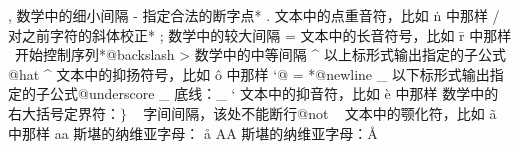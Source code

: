 \capcs , {数学中的细小间隔}{}{\@comma}
\capcs - {指定合法的断字点}*{\@minus}
\capcs . {文本中的点重音符，比如 \.n 中那样}{}{\@dot}
\capcs / {对之前字符的斜体校正}*{\@slash}
\capcs ; {数学中的较大间隔}{}{\@semi}
\capcs = {文本中的长音符号，比如 \=r 中那样}{}{\@equal}
\capac \ {开始控制序列}*{@backslash}
\capcs > {数学中的中等间隔}{}{\@greater}
\capac ^ {以上标形式输出指定的子公式}{}{@hat}
\capcs ^ {文本中的抑扬符号，比如 \^o 中那样}{}{\@hat}
{\catcode `@ = 
*{@newline}
}%
\capac _ {以下标形式输出指定的子公式}{}{@underscore}
\capcs _ {底线：\_}{}{\@underscore}
\capcs ` {文本中的抑音符，比如 \`e 中那样}{}{\@lquote}
\capac { {开始编组}{}{@lbrace}
\capcs { {数学中的左大括号定界符：$\{$}{}{\@lbrace}
\capcs | {数学中的平行线：$\Vert$}{}{\@bar}
\capac } {结束编组}{}{@rbrace}
\capcs } {数学中的右大括号定界符：$\}$}{}{\@rbrace}
\capac ~ {字间间隔，该处不能断行}{}{@not}
\capcs ~ {文本中的颚化符，比如 \~a 中那样}{}{\@not}
%
\capcs aa {斯堪的纳维亚字母： \aa}{}{}
\capcs AA {斯堪的纳维亚字母：\AA}{}{}
